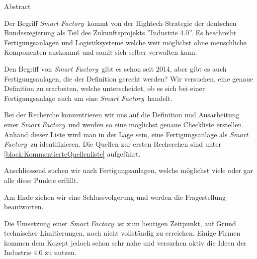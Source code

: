 \documentclass{article}
\def\SmartFactory{\textcolor{DarkestGray}{\textit{Smart Factory}}}
\begin{document}
\begin{Map}{Abstract}

Der Begriff \SmartFactory\ kommt von der Hightech-Strategie der deutschen Bundesregierung als Teil des Zukunftsprojekts ''Industrie 4.0''\cite{WasIndustrie40}. Es beschreibt Fertigungsanlagen und Logistiksysteme welche weit möglichst ohne menschliche Komponenten auskommt und somit sich selber verwalten kann\cite{Industrie40TippsUmsetzung}.

Den Begriff von \SmartFactory\ gibt es schon seit 2014, aber gibt es auch Fertigungsanlagen, die der Definition gerecht werden?
Wir versuchen, eine genaue Definition zu erarbeiten, welche unterscheidet, ob es sich bei einer Fertigungsanlage auch um eine \SmartFactory\ handelt.

Bei der Recherche konzentrieren wir uns auf die Definition und Ausarbeitung einer \SmartFactory\ und werden so eine möglichst genaue Checkliste erstellen. Anhand dieser Liste wird man in der Lage sein, eine Fertigungsanlage als \SmartFactory\ zu identifizieren. Die Quellen zur ersten Recherchen sind unter \ref{block:KommentierteQuellenliste} aufgeführt. \par

Anschliessend suchen wir nach Fertigungsanlagen, welche möglichst viele oder gar alle diese Punkte erfüllt. \par

Am Ende ziehen wir eine Schlussvolgerung und werden die Fragestellung beantworten.

Die Umsetzung einer \SmartFactory\ ist zum heutigen Zeitpunkt, auf Grund technischer Limitierungen, noch nicht vollständig zu erreichen.
Einige Firmen kommen dem Kozept jedoch schon sehr nahe und versuchen aktiv die Ideen der Industrie 4.0 zu nutzen.

\end{Map}
\end{document}
